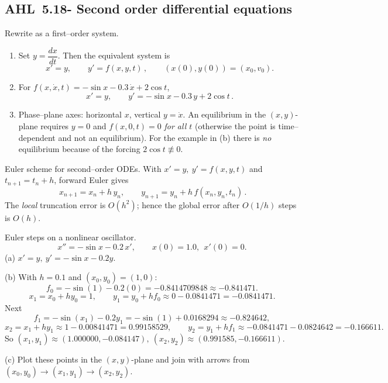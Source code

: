 \documentclass[11pt]{article}
\def\textbf#1{#1}%
\newcommand{\tocsubsection}[1]{\subsection{#1}}
\begin{document}
\tocsubsection{AHL 5.18- Second order differential equations}


\begin{solution}
\textbf{Rewrite as a first–order system.}
\begin{enumerate}
\item Set \(y=\dfrac{dx}{dt}\). Then the equivalent system is
\[
\boxed{\,x'=y,\qquad y'=f(x,y,t)\,},\qquad (x(0),y(0))=(x_0,v_0).
\]
\item For \(f(x,\dot x,t)=-\sin x-0.3\,\dot x+2\cos t\),
\[
\boxed{\,x'=y,\qquad y'=-\sin x-0.3\,y+2\cos t\,}.
\]
\item Phase–plane axes: horizontal \(x\), vertical \(y=\dot x\).
An equilibrium in the \((x,y)\)-plane requires \(y=0\) and \(f(x,0,t)=0\) \emph{for all \(t\)} (otherwise the point is time–dependent and not an equilibrium).
For the example in (b) there is \emph{no} equilibrium because of the forcing \(2\cos t\not\equiv0\).
\end{enumerate}
\end{solution}

\begin{solution}
\textbf{Euler scheme for second–order ODEs.}
With \(x'=y,\ y'=f(x,y,t)\) and \(t_{n+1}=t_n+h\), forward Euler gives
\[
\boxed{\,x_{n+1}=x_n+h\,y_n,\qquad y_{n+1}=y_n+h\,f(x_n,y_n,t_n)\,}.
\]
The \emph{local} truncation error is \(O(h^{2})\); hence the global error after \(O(1/h)\) steps is \(O(h)\).
\end{solution}

\begin{solution}
\textbf{Euler steps on a nonlinear oscillator.}
\[
x''=-\sin x-0.2\,x',\qquad x(0)=1.0,\ \ x'(0)=0.
\]
(a) \(x'=y,\ y'=-\sin x-0.2y.\)

(b) With \(h=0.1\) and \((x_0,y_0)=(1,0)\):
\[
f_0=-\sin(1)-0.2(0)= -0.8414709848\approx -0.841471.
\]
\[
x_1=x_0+h y_0=1,\qquad y_1=y_0+h f_0\approx 0-0.0841471=-0.0841471.
\]
Next
\[
f_1=-\sin(x_1)-0.2y_1= -\sin(1)+0.0168294\approx -0.824642,
\]
\[
x_2=x_1+h y_1\approx 1-0.00841471=0.99158529,\qquad
y_2=y_1+h f_1\approx -0.0841471-0.0824642=-0.166611.
\]
So \(\boxed{(x_1,y_1)\approx(1.000000,-0.084147)},\ \boxed{(x_2,y_2)\approx(0.991585,-0.166611)}\).

(c) Plot these points in the \((x,y)\)-plane and join with arrows from \((x_0,y_0)\to(x_1,y_1)\to(x_2,y_2)\).
\end{solution}
\end{document}
